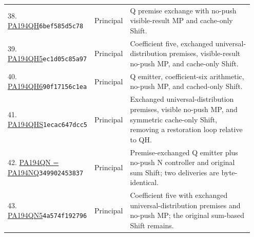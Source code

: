\begin{longtable}{@{}p{0.27\linewidth}p{0.13\linewidth}p{0.55\linewidth}@{}}
38. \href{https://github.com/VladimirReshetnikov/ProveIt/blob/32d0d8b7d93a63ad4106c18cdb29b37927acdad2/Computability/BusyBeaver/Research/PA/docs/pa194qh_conpa_2026-11-13/machine/machine.tm}{PA194QH}\newline\texttt{6bef585d5c78} & Principal & Q premise exchange with no-push visible-result MP and cache-only Shift.\\[5pt]
39. \href{https://github.com/VladimirReshetnikov/ProveIt/blob/32d0d8b7d93a63ad4106c18cdb29b37927acdad2/Computability/BusyBeaver/Research/PA/docs/pa194_qh5_research_2026-11-14/machine/machine.tm}{PA194QH5}\newline\texttt{ec1d05c85a97} & Principal & Coefficient five, exchanged universal-distribution premises, visible-result no-push MP, and cache-only Shift.\\[5pt]
40. \href{https://github.com/VladimirReshetnikov/ProveIt/blob/32d0d8b7d93a63ad4106c18cdb29b37927acdad2/Computability/BusyBeaver/Research/PA/docs/pa194qh6_conpa_2026-11-13/machine/machine.tm}{PA194QH6}\newline\texttt{90f17156c1ea} & Principal & Q emitter, coefficient-six arithmetic, no-push MP, and cached-only Shift.\\[5pt]
41. \href{https://github.com/VladimirReshetnikov/ProveIt/blob/32d0d8b7d93a63ad4106c18cdb29b37927acdad2/Computability/BusyBeaver/Research/PA/docs/pa194qhs_conpa_2026-11-14/machine/machine.tm}{PA194QHS}\newline\texttt{1ecac647dcc5} & Principal & Exchanged universal-distribution premises, visible no-push MP, and symmetric cache-only Shift, removing a restoration loop relative to QH.\\[5pt]
42. \href{https://github.com/VladimirReshetnikov/ProveIt/blob/32d0d8b7d93a63ad4106c18cdb29b37927acdad2/Computability/BusyBeaver/Research/PA/docs/pa194qn_research_2026-11-13/machine/machine.tm}{PA194QN = PA194NQ}\newline\texttt{349902453837} & Principal & Premise-exchanged Q emitter plus no-push N controller and original sum Shift; two deliveries are byte-identical.\\[5pt]
43. \href{https://github.com/VladimirReshetnikov/ProveIt/blob/32d0d8b7d93a63ad4106c18cdb29b37927acdad2/Computability/BusyBeaver/Research/PA/docs/pa194qn_2026-11-14/machines/PA194QN5/machine.tm}{PA194QN5}\newline\texttt{4a574f192796} & Principal & Coefficient five with exchanged universal-distribution premises and no-push MP; the original sum-based Shift remains.\\[5pt]

\end{longtable}
